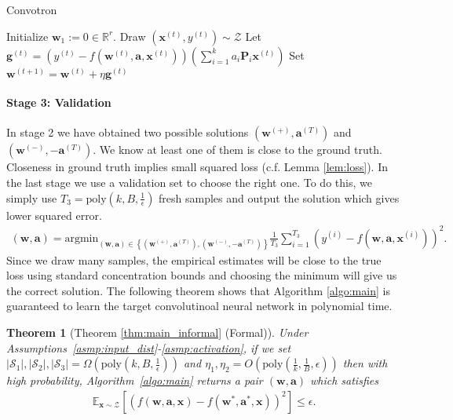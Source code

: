 \documentclass[11pt]{article}
\newcommand{\argmin}{\mathrm{argmin}}
\newcommand{\poly}{\mathrm{poly}}
\newcommand{\mat}[1]{\mathbf{#1}}
\newcommand{\vect}[1]{\mathbf{#1}}
\newcommand{\abs}[1]{\left|#1\right|}
\newcommand{\expect}{\mathbb{E}}
\newcommand{\inputdist}{\mathcal{Z}}
\newtheorem{thm}{Theorem}[section]
\newcommand{\simon}[1]{\textcolor{blue}{[Simon: #1]}}
\begin{document}
\begin{algorithm}[t]
   \caption{Convotron \citep{goel2018learning}}
   \label{alg:convotron}
\begin{algorithmic}
   \State Initialize $\vect{w}_1 := 0 \in \mathbb{R}^r$.
   \State Draw $(\vect{x}^{(t)}, y^{(t)}) \sim \inputdist$
   \State Let $\vect{g}^{(t)} = (y^{(t)} - f(\vect{w}^{(t)}, \vect{a}, \vect{x}^{(t)}))  \left(\sum_{i=1}^k a_i \mat{P}_i  \vect{x}^{(t)}\right)$
   \State Set $\vect{w}^{(t+1)} = \vect{w}^{(t)} + \eta \vect{g}^{(t)}$
   \EndFor
   \State{Return $\vect{w}_{T+1}$}
\end{algorithmic}
\end{algorithm}\paragraph{Stage 3: Validation}
In stage 2 we have obtained two possible solutions $\left(\vect{w}^{(+)},\vect{a}^{(T)}\right)$ and $\left(\vect{w}^{(-)},-\vect{a}^{(T)}\right)$.
We know at least one of them is close to the ground truth. Closeness in ground truth implies small squared loss (c.f. Lemma \ref{lem:loss}). 
In the last stage we use a validation set to choose the right one.
To do this, we simply use $T_3 = \poly\left(k,B,\frac{1}{\epsilon}\right)$ fresh samples and output the solution which gives lower squared error. 
\begin{align}
\left(\vect{w},\vect{a}\right) = \argmin_{\left(\vect{w},\vect{a}\right) \in \left\{\left(\vect{w}^{(+)},\vect{a}^{(T)}\right), \left(\vect{w}^{(-)},-\vect{a}^{(T)}\right)\right\}} \frac{1}{T_3}\sum_{i=1}^{T_3}\left(y^{(i)} - f\left(\vect{w},\vect{a},\vect{x}^{(i)}\right) \right)^2.\label{eqn:hypo_testing}
\end{align}
Since we draw many samples, the empirical estimates will be close to the true loss using standard concentration bounds and choosing the minimum will give us the correct solution.
The following theorem shows that Algorithm \ref{algo:main} is guaranteed to learn the target convolutinoal neural network in polynomial time.
\begin{thm}[Theorem \ref{thm:main_informal} (Formal)]
  \label{thm:main}{}
Under Assumptions~\ref{asmp:input_dist}-\ref{asmp:activation}, if we set $\abs{\mathcal{S}_1},\abs{\mathcal{S}_2},\abs{\mathcal{S}_3} = \Omega\left(\poly\left(k,B,\frac{1}{\epsilon}\right)\right)$ and $\eta_1, \eta_2 = O\left(\poly\left(\frac{1}{k},\frac{1}{B},\epsilon\right)\right)$ then with high probability, Algorithm~\ref{algo:main} returns a pair $\left(\vect{w},\vect{a}\right)$ which satisfies\begin{align*}
  \expect_{\vect{x} \sim \inputdist}\left[ \left(f(\vect{w},\vect{a},\vect{x})-f(\vect{w}^*,\vect{a}^*,\vect{x})\right)^2\right] \le \epsilon.
\end{align*}
\end{thm}
\end{document}
